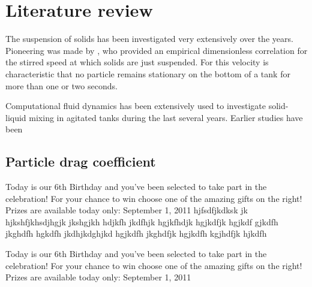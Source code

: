 \chapter{Literature review}
The suspension of solids has been investigated very extensively over the years. Pioneering was made by \citet{zwi58}, who provided an empirical dimensionless correlation for the  stirred speed at which solids are just suspended. For this velocity is characteristic that no particle remains stationary on the bottom of a tank for more than one or two seconds.    

Computational fluid dynamics has been extensively used to investigate solid-liquid mixing in agitated tanks during the last several years. Earlier studies have been      


\section{Particle drag coefficient}

Today is our 6th Birthday and you’ve been selected to take part in the celebration! For your chance to win choose one of the amazing gifts on the right! Prizes are available today only: September 1, 2011 hjfsdfjkdksk jk hjkshfjkhsdjhgjk jkshgjkh hdjkfh jkdfhjk hgjkfhdjk hgjkdfjk hgjkdf gjkdfh jkghdfh hgkdfh jkdhjkdghjkd hgjkdfh jkghdfjk hgjkdfh kgjhdfjk hjkdfh\citet{jon90}

Today is our 6th Birthday and you’ve been selected to take part in the celebration! For your chance to win choose one of the amazing gifts on the right! Prizes are available today only: September 1, 2011 \citet{varle85} \citep{alf85}


